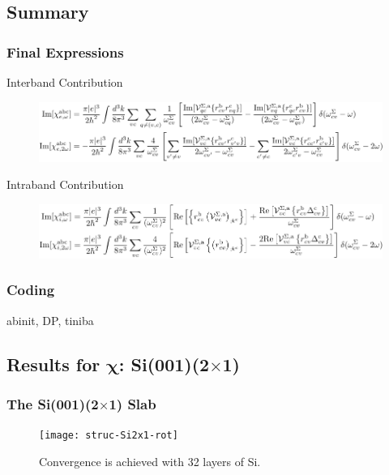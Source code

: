 \documentclass{beamer}
\begin{document}

\subsection{Summary}

\begin{frame}
\frametitle{Final Expressions}
\begin{block}{Interband Contribution}
\begin{figure}
\centering
\includegraphics[scale=0.70]{chis_inter}
\end{figure}
\end{block}
\begin{alertblock}{Intraband Contribution}
\begin{figure}
\centering
\includegraphics[scale=0.70]{chis_intra}
\end{figure}
\end{alertblock}
\end{frame}

\begin{frame}
\frametitle{Coding}
abinit, DP, tiniba
\end{frame}


\subsection{Results for \texorpdfstring{$\boldsymbol{\chi}$}{X}:
\texorpdfstring{Si(001)(2$\times$1)}{Si(001)(2x1)}}

\begin{frame}
\frametitle{The Si(001)(2$\times$1) Slab}
\begin{figure}
\centering
\texttt{[image: struc-Si2x1-rot]}
\caption{Convergence is achieved with 32 layers of Si.}
\end{figure}
\end{frame}
\end{document}

